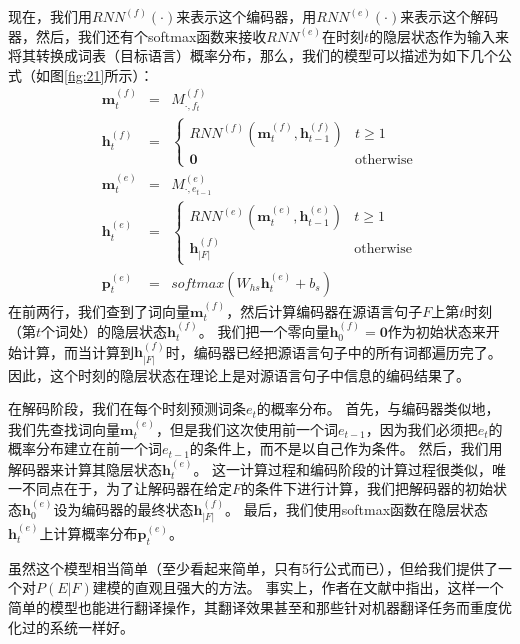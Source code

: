 \documentclass[10pt,a4paper]{ctexart}
\begin{document}
现在，我们用$RNN^{(f)}(\cdot)$来表示这个编码器，用$RNN^{(e)}(\cdot)$来表示这个解码器，然后，我们还有个softmax函数来接收$RNN^{(e)}$在时刻$t$的隐层状态作为输入来将其转换成词表（目标语言）概率分布，那么，我们的模型可以描述为如下几个公式（如图\ref{fig:21}所示）：
\begin{eqnarray}
   \textbf{m}_t^{(f)} & = & M_{\cdot,f_t}^{(f)} \nonumber \\
   \textbf{h}_t^{(f)} & = & \left\{ \begin{array}{ll}
      RNN^{(f)}(\textbf{m}_t^{(f)},\textbf{h}_{t-1}^{(f)}) & t \geq 1 \\
      \textbf{0} & \textrm{otherwise}
      \end{array} \right. \nonumber \\
   \textbf{m}_t^{(e)} & = & M_{\cdot,e_{t-1}}^{(e)} \nonumber \\
   \textbf{h}_t^{(e)} & = & \left\{ \begin{array}{ll}
      RNN^{(e)}(\textbf{m}_t^{(e)},\textbf{h}_{t-1}^{(e)}) & t \geq 1 \\
      \textbf{h}_{|F|}^{(f)} & \textrm{otherwise}
      \end{array} \right. \nonumber \\
   \textbf{p}_t^{(e)} & = & softmax(W_{hs}\textbf{h}_t^{(e)} + b_s) \label{eq:60}
\end{eqnarray}
在前两行，我们查到了词向量$\textbf{m}_t^{(f)}$，然后计算编码器在源语言句子$F$上第$t$时刻（第$t$个词处）的隐层状态$\textbf{h}_t^{(f)}$。
我们把一个零向量$\textbf{h}_0^{(f)}=\textbf{0}$作为初始状态来开始计算，而当计算到$\textbf{h}_{|F|}^{(f)}$时，编码器已经把源语言句子中的所有词都遍历完了。
因此，这个时刻的隐层状态在理论上是对源语言句子中信息的编码结果了。

在解码阶段，我们在每个时刻预测词条$e_t$的概率分布。
首先，与编码器类似地，我们先查找词向量$\textbf{m}_t^{(e)}$，但是我们这次使用前一个词$e_{t-1}$，因为我们必须把$e_t$的概率分布建立在前一个词$e_{t-1}$的条件上，而不是以自己作为条件。
然后，我们用解码器来计算其隐层状态$\textbf{h}_t^{(e)}$。
这一计算过程和编码阶段的计算过程很类似，唯一不同点在于，为了让解码器在给定$F$的条件下进行计算，我们把解码器的初始状态$\textbf{h}_0^{(e)}$设为编码器的最终状态$\textbf{h}_{|F|}^{(f)}$。
最后，我们使用softmax函数在隐层状态$\textbf{h}_t^{(e)}$上计算概率分布$\textbf{p}_t^{(e)}$。

虽然这个模型相当简单（至少看起来简单，只有5行公式而已），但给我们提供了一个对$P(E|F)$建模的直观且强大的方法。
事实上，作者在文献\cite{sutskever2014sequence}中指出，这样一个简单的模型也能进行翻译操作，其翻译效果甚至和那些针对机器翻译任务而重度优化过的系统一样好。
\end{document}
